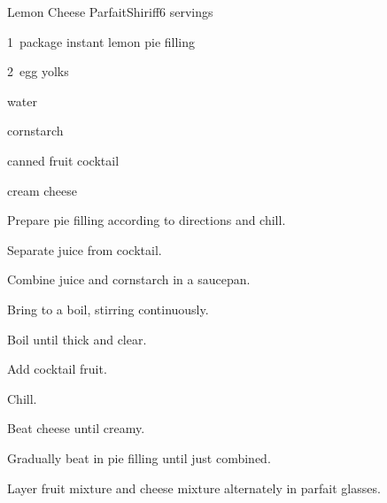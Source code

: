 \begin{recipe}{Lemon Cheese Parfait}{Shiriff}{6 servings}

\begin{ingredients}
\item 1~package instant lemon pie filling
\item 2~egg yolks
\item \C{2\half} water
\item {} cornstarch
\item {} canned fruit cocktail
\item {} cream cheese
\end{ingredients}

\begin{directions}
\item Prepare pie filling according to directions and chill.
\item Separate juice from cocktail.
\item Combine juice and cornstarch in a saucepan.
\item Bring to a boil, stirring continuously.
\item Boil until thick and clear.
\item Add cocktail fruit.
\item Chill.
\item Beat cheese until creamy.
\item Gradually beat in pie filling until just combined.
\item Layer fruit mixture and cheese mixture alternately in parfait glasses.
\end{directions}

\end{recipe}
